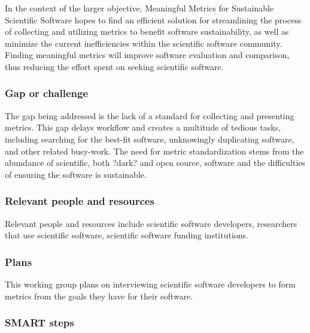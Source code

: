 In the context of the larger objective, Meaningful Metrics for Sustainable Scientific Software hopes to find an efficient solution for streamlining the process of collecting and utilizing metrics to benefit software sustainability, as well as minimize the current inefficiencies within the scientific software community. Finding meaningful metrics will improve software evaluation and comparison, thus reducing the effort spent on seeking scientific software.

\subsubsection{Gap or challenge}


The gap being addressed is the lack of a standard for collecting and presenting metrics. This gap delays workflow and creates a multitude of tedious tasks, including searching for the best-fit software, unknowingly duplicating software, and other related busy-work. The need for metric standardization stems from the abundance of scientific, both ?dark? and open source, software and the difficulties of ensuring the software is sustainable. 

\subsubsection{Relevant people and resources}


Relevant people and resources include scientific software developers, researchers that use scientific software, scientific software funding institutions. 

\subsubsection{Plans}


This working group plans on interviewing scientific software developers to form metrics from the goals they have for their software. 

\subsubsection{SMART steps}


